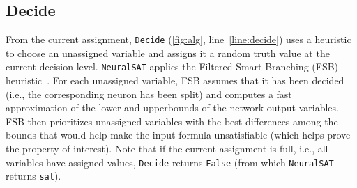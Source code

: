 \documentclass[oneside,11pt,dvipsnames]{book}
\numberwithin{equation}{section}
\theoremstyle{definition}
\theoremstyle{remark}
\newcommand{\tool}{\texttt{NeuralSAT}}
\begin{document}
\subsection{Decide}\label{sec:decide}

From the current assignment, \texttt{Decide} (\autoref{fig:alg}, line~\ref{line:decide}) uses a heuristic to choose an unassigned variable and assigns it a random truth value at the current decision level.
\tool{} applies the Filtered Smart Branching (FSB) heuristic~\cite{bunel2018unified,de2021improved}. For each unassigned variable, FSB assumes that it has been decided (i.e., the corresponding neuron has been split) and computes a fast approximation of the lower and upperbounds of the network output variables.  FSB then prioritizes unassigned variables with the best differences among the bounds that would help make the input formula unsatisfiable (which helps prove the property of interest).
Note that if the current assignment is full, i.e., all variables have assigned values, \texttt{Decide} returns \texttt{False} (from which \tool{} returns \texttt{sat}).






\end{document}

